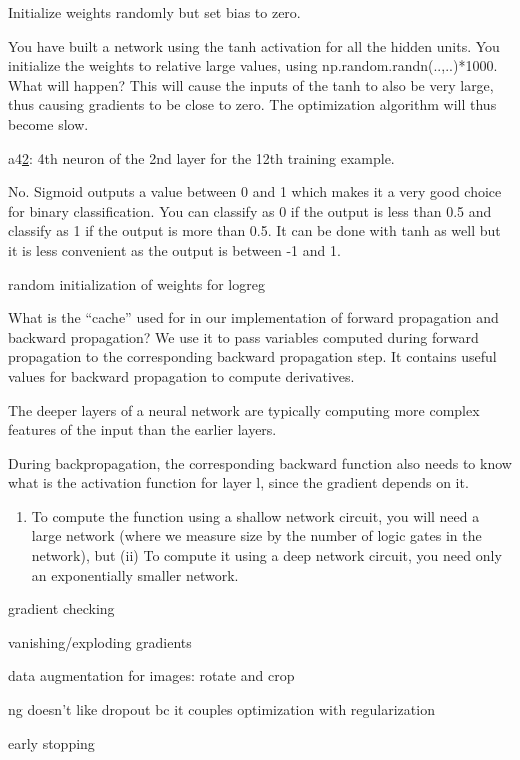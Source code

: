 \documentclass[]{book}
\providecommand{\tightlist}{%
  \setlength{\itemsep}{0pt}\setlength{\parskip}{0pt}}
\begin{document}
Initialize weights randomly but set bias to zero.

You have built a network using the tanh activation for all the hidden
units. You initialize the weights to relative large values, using
np.random.randn(..,..)*1000. What will happen? This will cause the
inputs of the tanh to also be very large, thus causing gradients to be
close to zero. The optimization algorithm will thus become slow.

a4\href{12}{2}: 4th neuron of the 2nd layer for the 12th training
example.

No. Sigmoid outputs a value between 0 and 1 which makes it a very good
choice for binary classification. You can classify as 0 if the output is
less than 0.5 and classify as 1 if the output is more than 0.5. It can
be done with tanh as well but it is less convenient as the output is
between -1 and 1.

random initialization of weights for logreg

What is the ``cache'' used for in our implementation of forward
propagation and backward propagation? We use it to pass variables
computed during forward propagation to the corresponding backward
propagation step. It contains useful values for backward propagation to
compute derivatives.

The deeper layers of a neural network are typically computing more
complex features of the input than the earlier layers.

During backpropagation, the corresponding backward function also needs
to know what is the activation function for layer l, since the gradient
depends on it.

\begin{enumerate}
\def\labelenumi{(\roman{enumi})}
\tightlist
\item
  To compute the function using a shallow network circuit, you will need
  a large network (where we measure size by the number of logic gates in
  the network), but (ii) To compute it using a deep network circuit, you
  need only an exponentially smaller network.
\end{enumerate}

gradient checking

vanishing/exploding gradients

data augmentation for images: rotate and crop

ng doesn't like dropout bc it couples optimization with regularization

early stopping
\end{document}

